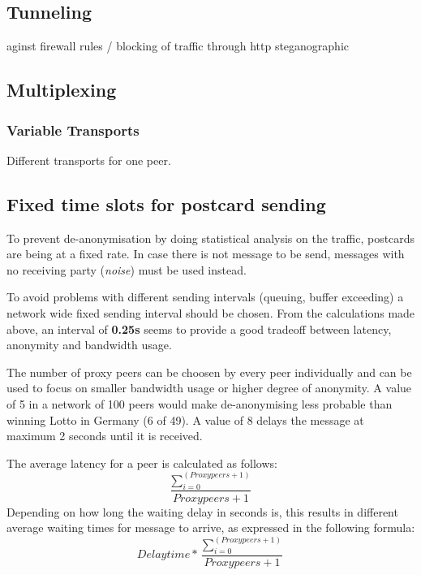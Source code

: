 \subsection{Tunneling}
aginst firewall rules / blocking of traffic
through http
steganographic

\subsection{Multiplexing}
\subsubsection{Variable Transports}
Different transports for one peer.
\subsection{Fixed time slots for postcard sending}
To prevent de-anonymisation by doing statistical analysis on the traffic,
postcards are being at a fixed rate.
In case there is not message to be send, messages with no receiving
party (\textit{noise}) must be used instead.

To avoid problems with different sending intervals
(queuing, buffer exceeding) a network wide fixed sending interval
should be chosen. From the calculations made above, an interval
of \textbf{0.25s} seems to provide a good tradeoff between
latency, anonymity and bandwidth usage.

The number of proxy peers can be choosen by every peer individually
and can be used to focus on smaller bandwidth usage or higher degree
of anonymity. A value of 5 in a network of 100 peers
would make de-anonymising less probable than winning Lotto in Germany
(6 of 49). A value of 8 delays the message at maximum 2 seconds until
it is received.

The average latency for a peer is calculated as follows:
$$\frac{\sum\limits_{i=0}^{(Proxy peers +1)}}{Proxy peers + 1}$$
Depending on how long the waiting delay in seconds is, this results
in different average waiting times for message to arrive, as expressed in
the following formula:
$$Delaytime * \frac{\sum\limits_{i=0}^{(Proxy peers +1)}}{Proxy peers + 1}$$


